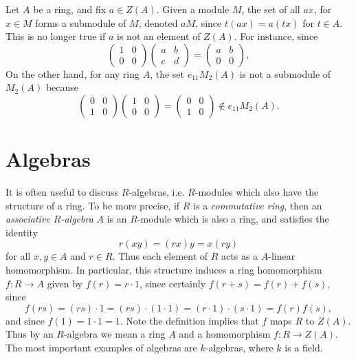 \begin{example}
    Let $A$ be a ring, and fix $a \in Z(A)$. Given a module $M$, the set of all $ax$, for $x \in M$ forms a submodule of $M$, denoted $aM$, since $t(ax) = a(tx)$ for $t \in A$. This is no longer true if $a$ is not an element of $Z(A)$. For instance, since
    \[ \begin{pmatrix} 1 & 0 \\ 0 & 0 \end{pmatrix} \begin{pmatrix} a & b \\ c & d \end{pmatrix} = \begin{pmatrix} a & b \\ 0 & 0 \end{pmatrix}, \]
    On the other hand, for any ring $A$, the set $e_{11} M_2(A)$ is not a submodule of $M_2(A)$ because
    \[ \begin{pmatrix} 0 & 0 \\ 1 & 0 \end{pmatrix} \begin{pmatrix} 1 & 0 \\ 0 & 0 \end{pmatrix} = \begin{pmatrix} 0 & 0 \\ 1 & 0 \end{pmatrix} \not \in e_{11} M_2(A). \]
\end{example}

\section{Algebras}

It is often useful to discuss $R$-algebras, i.e. $R$-modules which also have the structure of a ring. To be more precise, if $R$ is a \emph{commutative ring}, then an \emph{associative $R$-algebra} $A$ is an $R$-module which is also a ring, and satisfies the identity
%
\[ r(xy) = (rx) y = x(ry) \]
%
for all $x,y \in A$ and $r \in R$. Thus each element of $R$ acts as a $A$-linear homomorphism. In particular, this structure induces a ring homomorphism $f: R \to A$ given by $f(r) = r \cdot 1$, since certainly $f(r + s) = f(r) + f(s)$, since
%
\[ f(rs) = (rs) \cdot 1 = (rs) \cdot (1 \cdot 1) = (r \cdot 1) \cdot (s \cdot 1) = f(r) f(s), \]
%
and since $f(1) = 1 \cdot 1 = 1$. Note the definition implies that $f$ maps $R$ to $Z(A)$. Thus by an $R$-algebra we mean a ring $A$ and a homomorphism $f: R \to Z(A)$. The most important examples of algebras are $k$-algebras, where $k$ is a field.

